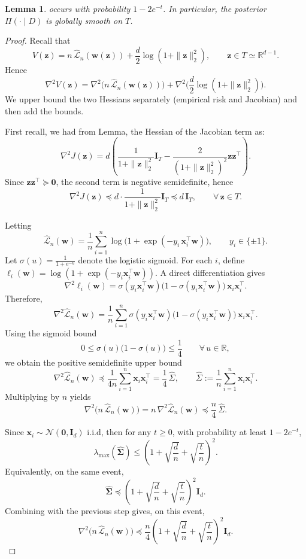 \documentclass{article}
\theoremstyle{plain}
\newtheorem{lemma}[theorem]{Lemma}
\theoremstyle{definition}
\theoremstyle{remark}
\begin{document}
{\begin{lemma}
occurs with probability $1-2e^{-t}$. 
In particular, the posterior $\Pi(\cdot\mid D)$ is globally smooth on $T$.
\end{lemma}

\begin{proof}
Recall that
\[
V(\mathbf z)
= n\,\widehat{\mathcal L}_n(\mathbf w(\mathbf z))
+ \frac{d}{2}\log(1+\|\mathbf z\|_2^2),
\qquad \mathbf z\in T\simeq \mathbb R^{d-1}.
\]
Hence
\[
\nabla^2 V(\mathbf z)
=
\nabla^2\!\Big(n\,\widehat{\mathcal L}_n(\mathbf w(\mathbf z))\Big)
+
\nabla^2\!\Big(\frac{d}{2}\log(1+\|\mathbf z\|_2^2)\Big).
\]
We upper bound the two Hessians separately (empirical risk and Jacobian) and then add the bounds.


First recall, we had from Lemma, the Hessian of the Jacobian term as:
\[
\nabla^2 J(\mathbf z)
=
d\left(
\frac{1}{1+\|\mathbf z\|_2^2}\mathbf I_T
-
\frac{2}{(1+\|\mathbf z\|_2^2)^2}\mathbf z\mathbf z^\top
\right).
\]
Since $\mathbf z\mathbf z^\top\succeq \mathbf 0$, the second term is negative semidefinite, hence
\[
\nabla^2 J(\mathbf z)
\preceq
d\cdot \frac{1}{1+\|\mathbf z\|_2^2}\mathbf I_T
\preceq
d\,\mathbf I_T,
\qquad \forall\,\mathbf z\in T.
\]


Letting
\[
\widehat{\mathcal L}_n(\mathbf w)
=
\frac{1}{n}\sum_{i=1}^n \log\!\Big(1+\exp(-y_i\,\mathbf x_i^\top \mathbf w)\Big),
\qquad y_i\in\{\pm 1\}.
\]
Let $\sigma(u)=\frac{1}{1+e^{-u}}$ denote the logistic sigmoid.
For each $i$, define $\ell_i(\mathbf w)=\log(1+\exp(-y_i\mathbf x_i^\top \mathbf w))$.
A direct differentiation gives
\[
\nabla^2 \ell_i(\mathbf w)
=
\sigma(y_i\mathbf x_i^\top \mathbf w)\Big(1-\sigma(y_i\mathbf x_i^\top \mathbf w)\Big)\,\mathbf x_i\mathbf x_i^\top.
\]
Therefore,
\[
\nabla^2 \widehat{\mathcal L}_n(\mathbf w)
=
\frac{1}{n}\sum_{i=1}^n
\sigma(y_i\mathbf x_i^\top \mathbf w)\Big(1-\sigma(y_i\mathbf x_i^\top \mathbf w)\Big)\,\mathbf x_i\mathbf x_i^\top.
\]
Using the sigmoid bound
\[
0\le \sigma(u)\big(1-\sigma(u)\big)\le \frac14
\qquad \forall\,u\in\mathbb R,
\]
we obtain the positive semidefinite upper bound
\[
\nabla^2 \widehat{\mathcal L}_n(\mathbf w)
\preceq
\frac{1}{4n}\sum_{i=1}^n \mathbf x_i\mathbf x_i^\top
=
\frac14\,\widehat{\Sigma},
\qquad
\widehat{\Sigma}:=\frac1n\sum_{i=1}^n \mathbf x_i\mathbf x_i^\top.
\]
Multiplying by $n$ yields
\[
\nabla^2\!\Big(n\,\widehat{\mathcal L}_n(\mathbf w)\Big)
=
n\,\nabla^2 \widehat{\mathcal L}_n(\mathbf w)
\preceq
\frac{n}{4}\,\widehat{\Sigma}.
\]

Since $\mathbf x_i\sim \mathcal N(\mathbf 0,\mathbf I_d)$ i.i.d,
then for any $t\ge 0$, with probability at least $1-2e^{-t}$,
\[
\lambda_{\max}(\widehat{\mathbf{\Sigma}})
\le
\left(1+\sqrt{\frac{d}{n}}+\sqrt{\frac{t}{n}}\right)^2.
\]
Equivalently, on the same event,
\[
\widehat{\mathbf{\Sigma}}
\preceq
\left(1+\sqrt{\frac{d}{n}}+\sqrt{\frac{t}{n}}\right)^2 \mathbf I_d.
\]
Combining with the previous step gives, on this event,
\[
\nabla^2\!\Big(n\,\widehat{\mathcal L}_n(\mathbf w)\Big)
\preceq
\frac{n}{4}
\left(1+\sqrt{\frac{d}{n}}+\sqrt{\frac{t}{n}}\right)^2 \mathbf I_d.
\]



\end{proof}}
\end{document}
